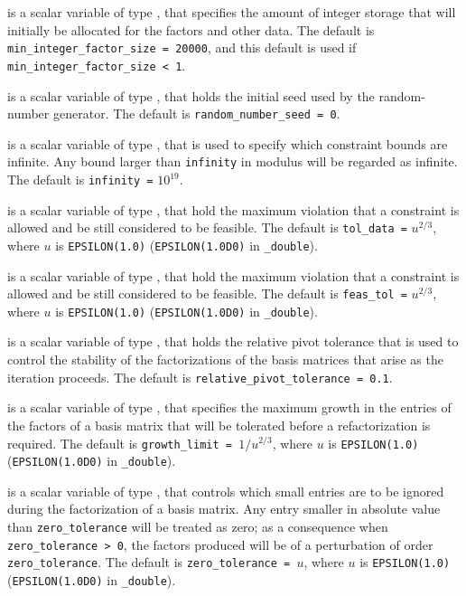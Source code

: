 \begin{description}
 is a scalar variable of type \integer,
that specifies the amount of integer storage that will initially be
allocated for the factors and other data.
The default is {\tt min\_integer\_factor\_size = 20000},
and this default is used if {\tt min\_integer\_factor\_size < 1}.

 is a scalar variable of type \integer,
that holds the initial seed used by the random-number generator.
The default is {\tt random\_number\_seed = 0}.

 is a scalar variable of type \realdp, that is used to
specify which constraint bounds are infinite.
Any bound larger than {\tt infinity} in modulus will be regarded as infinite.
The default is {\tt infinity =} $10^{19}$.

 is a scalar variable of type \realdp, that hold the
maximum violation that a constraint is allowed and be still considered to be
feasible.
The default is {\tt tol\_data =} $u^{2/3}$,
where $u$ is {\tt EPSILON(1.0)} ({\tt EPSILON(1.0D0)} in
{\tt \fullpackagename\_double}).

 is a scalar variable of type \realdp, that hold the
maximum violation that a constraint is allowed and be still considered to be
feasible.
The default is {\tt feas\_tol =} $u^{2/3}$,
where $u$ is {\tt EPSILON(1.0)} ({\tt EPSILON(1.0D0)} in
{\tt \fullpackagename\_double}).

 is a scalar variable of type \realdp,
that holds the relative pivot tolerance that is used to control the
stability of the factorizations of the basis matrices that arise as the
iteration proceeds.
The default is {\tt relative\_pivot\_tolerance = 0.1}.

 is a scalar variable of type \realdp, that
specifies the maximum growth in the entries of the factors of a basis
matrix that will be tolerated before a refactorization is required.
The default is {\tt growth\_limit = $1/u^{2/3}$},
where $u$ is {\tt EPSILON(1.0)} ({\tt EPSILON(1.0D0)} in
{\tt \fullpackagename\_double}).

 is a scalar variable of type \realdp, that
controls which small entries are to be ignored during the factorization
of a basis matrix. Any entry smaller in absolute value than
{\tt zero\_\-tolerance} will be treated as zero; as a consequence when
{\tt zero\_tolerance > 0}, the factors produced will be of a perturbation
of order {\tt zero\_tolerance}.
The default is {\tt zero\_tolerance = $u$},
where $u$ is {\tt EPSILON(1.0)} ({\tt EPSILON(1.0D0)} in
{\tt \fullpackagename\_double}).


\end{description}

